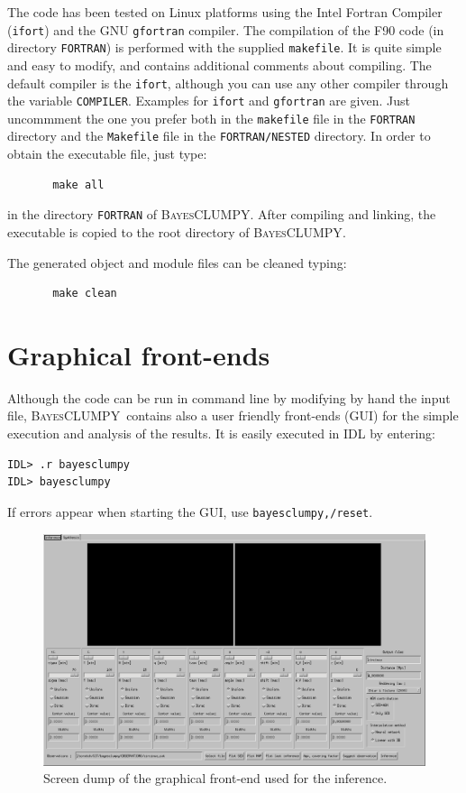 \documentclass[12pt]{article}
\def\B{\textsc{BayesCLUMPY}}
\begin{document}
The code has been tested on Linux platforms using the Intel Fortran
Compiler (\texttt{ifort}) and the GNU \texttt{gfortran} compiler. The compilation 
of the F90 code (in directory \texttt{FORTRAN}) is performed
with the supplied \texttt{makefile}. It is quite simple and easy to modify, and
contains additional comments about compiling. The
default compiler is the \texttt{ifort}, although you can use any other
compiler through the variable \texttt{COMPILER}. Examples for \texttt{ifort}
and \texttt{gfortran} are given. Just uncommment the one you prefer both in the \texttt{makefile}
file in the \texttt{FORTRAN} directory and the \texttt{Makefile} file in the 
\texttt{FORTRAN/NESTED} directory.
In order to obtain the executable file, just type:
\begin{verbatim}
       make all
\end{verbatim}
in the directory \texttt{FORTRAN} of \B. After compiling and linking, the executable is copied to the root directory of
\B.

The generated object and module files can be cleaned typing:
\begin{verbatim}
       make clean
\end{verbatim}


\section{Graphical front-ends}
Although the code can be run in command line by modifying by hand the input file, 
\B\ contains also a user friendly front-ends (GUI) for the simple execution and
analysis of the results. It is easily executed in IDL by entering:
\begin{verbatim}
IDL> .r bayesclumpy
IDL> bayesclumpy
\end{verbatim}
If errors appear when starting the GUI, use \texttt{bayesclumpy,/reset}.

\begin{figure}[!t]
\includegraphics[scale=0.5]{snapshot1.png}
\caption{Screen dump of the graphical front-end used for the inference.
\label{fig:inversion_GUI}}
\end{figure}
\end{document}
